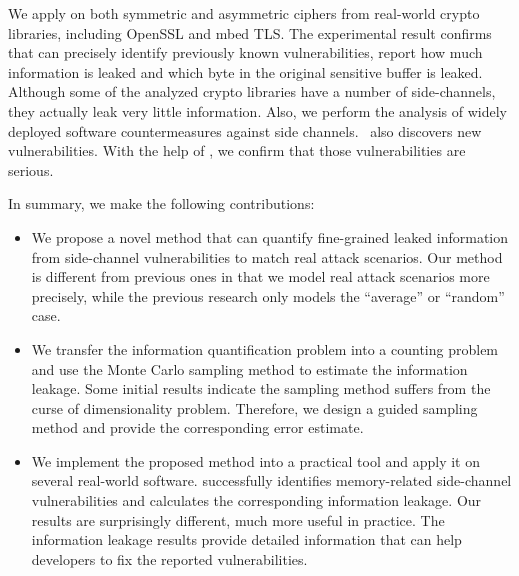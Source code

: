 We apply \tool{} on both symmetric and asymmetric ciphers from real-world crypto
libraries, including OpenSSL and mbed TLS\@. The experimental result confirms
that \tool{} can precisely identify previously known vulnerabilities, report
how much information is leaked and which byte in the original sensitive buffer
is leaked. Although some of the analyzed crypto libraries have a number of
side-channels, they actually leak very little information. Also, we perform the
analysis of widely deployed software countermeasures against side channels.
\tool\ also discovers new vulnerabilities. With the help of \tool{}, we confirm
that those vulnerabilities are serious.

In summary, we make the following contributions:

\begin{itemize}
      \item We propose a novel method that can quantify fine-grained leaked
            information from side-channel vulnerabilities to match real attack
            scenarios.  Our method is different from previous ones in that we
            model real attack scenarios more precisely, while the previous
            research only models the ``average'' or ``random'' case. 

      \item We transfer the information quantification problem into a counting
            problem and use the Monte Carlo sampling method to estimate the
            information leakage. Some initial results indicate the sampling
            method suffers from the curse of dimensionality problem. Therefore, we
            design a guided sampling method and provide the
            corresponding error estimate.

      \item We implement the proposed method into a practical tool and apply it
            on several real-world software. \tool{} successfully identifies
            memory-related side-channel vulnerabilities and calculates the
            corresponding information leakage. 
            Our results are surprisingly different, much more useful in practice.
            The information leakage results
            provide detailed information that can help developers to fix the
            reported vulnerabilities.
\end{itemize}
